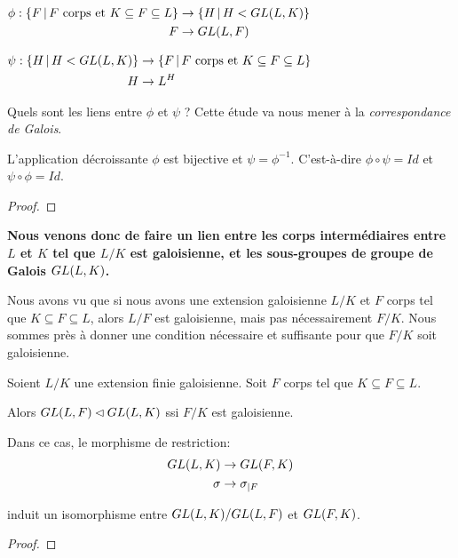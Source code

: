 \begin{center}
	$
	\begin{aligned}
		\phi :
			\left\{F \, | \, F \text{ corps et } K \subseteq F \subseteq L \right\}
			&\rightarrow \left\{H \, | \, H < GL(L, K) \right\}
			\\
			F &\rightarrow GL(L, F)
	\end{aligned}
	$

	$
	\begin{aligned}
		\psi :
			\left\{H \, | \, H < GL(L, K) \right\}
			&\rightarrow
			\left\{F \, | \, F \text{ corps et } K \subseteq F \subseteq L \right\}
			\\
			H &\rightarrow L^{H}
	\end{aligned}
	$
\end{center}

Quels sont les liens entre $\phi$ et $\psi$ ?
Cette étude va nous mener à la \textit{correspondance de Galois}.

\begin{theorem}
	\label{theorem:galois_correspondance}
	L'application décroissante $\phi$ est bijective et $\psi = \phi^{-1}$.
	C'est-à-dire $\phi \circ \psi = Id$ et $\psi \circ \phi = Id$.
\end{theorem}

\ifdefined\outputproof
\begin{proof}

\end{proof}
\fi

\textbf{Nous venons donc de faire un lien entre les corps intermédiaires entre $L$ et
$K$ tel que $L/K$ est galoisienne, et les sous-groupes de groupe de Galois
$GL(L, K)$.}

Nous avons vu que si nous avons une extension galoisienne $L/K$ et $F$ corps tel
que $K \subseteq F \subseteq L$, alors $L/F$ est galoisienne, mais pas
nécessairement $F/K$.
Nous sommes près à donner une condition nécessaire et suffisante pour que $F/K$
soit galoisienne.

\begin{proposition}
	Soient $L/K$ une extension finie galoisienne. Soit $F$ corps tel que $K
	\subseteq F \subseteq L$.

	Alors $GL(L, F) \lhd GL(L, K)$ ssi $F/K$ est
	galoisienne.

	Dans ce cas, le morphisme de restriction:
	\begin{align*}
		GL(L, K) &\rightarrow GL(F, K) \\
		\sigma &\rightarrow \sigma_{|F}
	\end{align*}

	induit un isomorphisme entre $GL(L, K)/GL(L, F)$ et
	$GL(F, K)$.
\end{proposition}

\ifdefined\outputproof
\begin{proof}

\end{proof}
\fi
